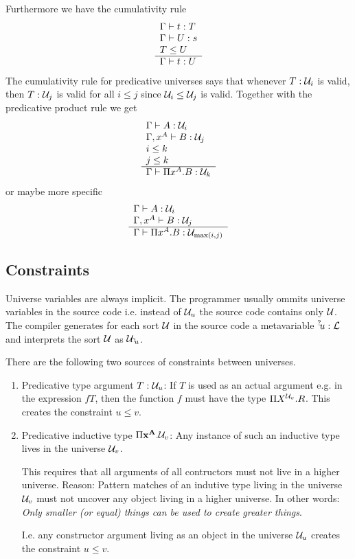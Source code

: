Furthermore we have the cumulativity rule
$$
\begin{array}{l} 
    \Gamma \vdash t : T
    \\
    \Gamma \vdash U : s
    \\
    T \le U
 \\ \hline 
    \Gamma \vdash t : U
 \end{array}
$$
The cumulativity rule for predicative universes says that whenever $T: {\cal U}_i$
is valid, then $T: {\cal U}_j$ is valid for all $i \le j$ since ${\cal U}_i \le {\cal U}_j$
is valid.  Together with the predicative product rule we get
$$
\begin{array}{l} 
    \Gamma \vdash A: {\cal U}_i
    \\
    \Gamma, x^A \vdash B: {\cal U}_j
    \\
    i \le k
    \\
    j \le k
 \\ \hline 
    \Gamma \vdash \Pi x^A.B : {\cal U}_k
 \end{array}
$$
or maybe more specific
$$
\begin{array}{l} 
    \Gamma \vdash A: {\cal U}_i
    \\
    \Gamma, x^A \vdash B: {\cal U}_j
 \\ \hline 
    \Gamma \vdash \Pi x^A.B : {\cal U}_{\text{max}(i,j)}
 \end{array}
$$






\subsection{Constraints}


Universe variables are always implicit. The programmer usually ommits universe
variables in the source code i.e. instead of ${\cal U}_u$ the source code contains
only ${\cal U}$. The compiler generates for each sort ${\cal U}$ in the source code a
metavariable ${{}^? \kern-0.2em u} : {\cal L}$ and interprets the sort ${\cal U}$ as ${\cal U}_{{{}^? \kern-0.2em u}}$.

There are the following two sources of constraints between universes.

\begin{enumerate}
    \item Predicative type argument $T: {\cal U}_{u}$: If $T$ is used as an actual
        argument e.g. in the expression $f T$, then the function $f$ must have
        the type $\Pi X^{{\cal U}_v}. R$.  This creates the constraint $u \le v$.

    \item Predicative inductive type $\Pi {\mathbf x}^{{\mathbf A}}. {\cal U}_{v}$: Any
        instance of such an inductive type lives in the universe ${\cal U}_{v}$.

        This requires that all arguments of all contructors must not live in a
        higher universe. Reason: Pattern matches of an indutive type living in
        the universe ${\cal U}_{v}$ must not uncover any object living in a
        higher universe. In other words: \emph{Only smaller (or equal) things
        can be used to create greater things}.

        I.e. any constructor argument living as an object in the universe
        ${\cal U}_u$ creates the constraint $u \le v$.
\end{enumerate}






